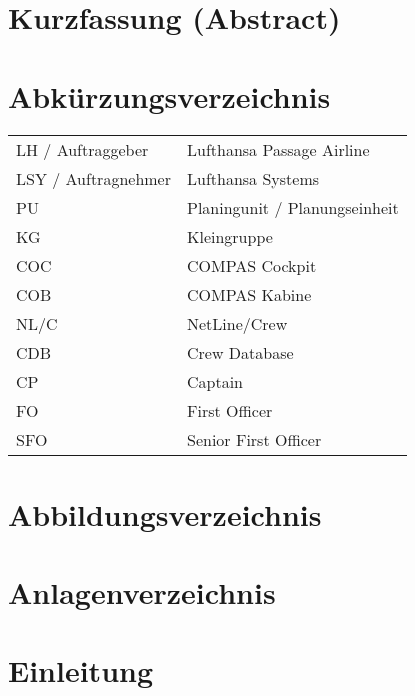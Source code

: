 \documentclass [12pt, a4paper, oneside, titlepage, ngerman]{article}
\begin{document}
\tableofcontents
\newpage


\section*{Kurzfassung (Abstract)}
\newpage

\section*{Abkürzungsverzeichnis}
\begin{table}[h!]
  \begin{tabular}{ll}
LH / Auftraggeber & Lufthansa Passage Airline \\
LSY / Auftragnehmer & Lufthansa Systems \\
PU & Planingunit / Planungseinheit \\
KG & Kleingruppe \\
COC & COMPAS Cockpit \\
COB & COMPAS Kabine \\
NL/C & NetLine/Crew \\
CDB & Crew Database \\
CP & Captain \\
FO & First Officer \\
SFO & Senior First Officer\

\end{tabular}
\end{table}
\newpage

\section*{Abbildungsverzeichnis}
\listoffigures
\newpage

\section*{Anlagenverzeichnis}
\newpage

\setcounter{page}{1}
\section{Einleitung }
\end{document}
